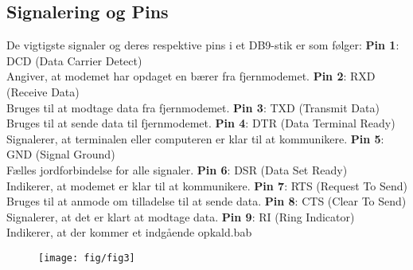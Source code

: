 \subsection{Signalering og Pins}
De vigtigste signaler og deres respektive pins i et DB9-stik er som følger:
\textbf{Pin 1}: DCD (Data Carrier Detect) \\ 
Angiver, at modemet har opdaget en bærer fra fjernmodemet.
\newline
\newline
\textbf{Pin 2}: RXD (Receive Data) \\ 
Bruges til at modtage data fra fjernmodemet.
\newline
\newline
\textbf{Pin 3}: TXD (Transmit Data) \\ 
Bruges til at sende data til fjernmodemet.
\newline
\newline
\textbf{Pin 4}: DTR (Data Terminal Ready) \\ 
Signalerer, at terminalen eller computeren er klar til at kommunikere.
\newline
\newline
\textbf{Pin 5}: GND (Signal Ground) \\ 
Fælles jordforbindelse for alle signaler.
\newline
\newline
\textbf{Pin 6}: DSR (Data Set Ready) \\ 
Indikerer, at modemet er klar til at kommunikere.
\newline
\newline
\textbf{Pin 7}: RTS (Request To Send) \\ 
Bruges til at anmode om tilladelse til at sende data.
\newline
\newline
\textbf{Pin 8}: CTS (Clear To Send) \\ 
Signalerer, at det er klart at modtage data.
\newline
\newline
\textbf{Pin 9}: RI (Ring Indicator) \\ 
Indikerer, at der kommer et indgående opkald.bab
\begin{figure}[!h]
	\centering
	\texttt{[image: fig/fig3]}
	\label{fig:fig3}
\end{figure}

